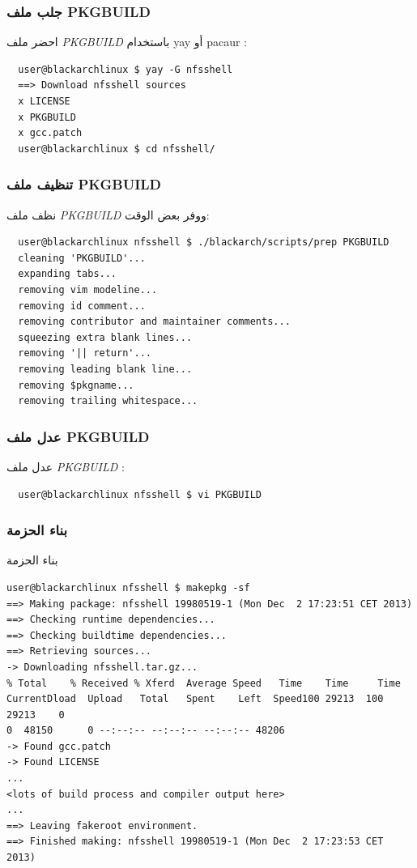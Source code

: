 \documentclass[a4paper, oneside, 11pt]{book}
\begin{document}
\subsubsection{جلب ملف PKGBUILD}
احضر ملف  \textit{PKGBUILD} باستخدام yay أو pacaur :
\begin{lstlisting}
  user@blackarchlinux $ yay -G nfsshell
  ==> Download nfsshell sources
  x LICENSE
  x PKGBUILD
  x gcc.patch
  user@blackarchlinux $ cd nfsshell/
\end{lstlisting}

\subsubsection{تنظيف ملف PKGBUILD}
نظف ملف  \textit{PKGBUILD}  ووفر بعض الوقت:
\begin{lstlisting}
  user@blackarchlinux nfsshell $ ./blackarch/scripts/prep PKGBUILD
  cleaning 'PKGBUILD'...
  expanding tabs...
  removing vim modeline...
  removing id comment...
  removing contributor and maintainer comments...
  squeezing extra blank lines...
  removing '|| return'...
  removing leading blank line...
  removing $pkgname...
  removing trailing whitespace...
\end{lstlisting}

\subsubsection{عدل ملف PKGBUILD }
عدل ملف  \textit{PKGBUILD} :
\begin{lstlisting}
  user@blackarchlinux nfsshell $ vi PKGBUILD
\end{lstlisting}

\subsubsection{بناء الحزمة}
بناء الحزمة
\begin{lstlisting}user@blackarchlinux nfsshell $ makepkg -sf
==> Making package: nfsshell 19980519-1 (Mon Dec  2 17:23:51 CET 2013)
==> Checking runtime dependencies...
==> Checking buildtime dependencies...
==> Retrieving sources...
-> Downloading nfsshell.tar.gz...
% Total    % Received % Xferd  Average Speed   Time    Time     Time
CurrentDload  Upload   Total   Spent    Left  Speed100 29213  100 29213    0
0  48150      0 --:--:-- --:--:-- --:--:-- 48206
-> Found gcc.patch
-> Found LICENSE
...
<lots of build process and compiler output here>
...
==> Leaving fakeroot environment.
==> Finished making: nfsshell 19980519-1 (Mon Dec  2 17:23:53 CET 2013)
\end{lstlisting}
\end{document}
